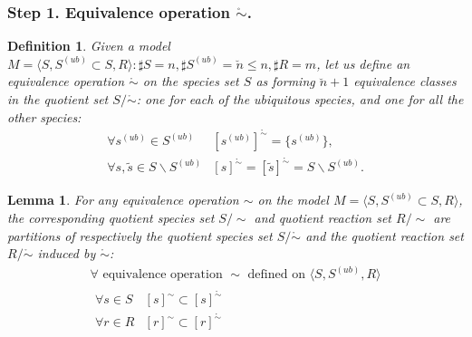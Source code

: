 \documentclass[9pt]{article}
\newcounter{lm}
\newcounter{def}
\newcounter{rm}
\begin{document}
\subsubsection*{Step 1. Equivalence operation $\mathring{\sim}$.}
\newtheorem{eq0}[def]{Definition}\label{equiv0}
\begin{eq0}
Given a model $M=\langle S, S^{(ub)}\subset{S}, R \rangle : \sharp S = n, \sharp S^{(ub)}=\breve{n} \leq n, \sharp R = m$, let us define an \emph{equivalence operation $\mathring{\sim}$} on the species set $S$ as forming $\breve{n} + 1$ equivalence classes in the quotient set $S/\mathring{\sim}$: one for each of the ubiquitous species, and one for all the other species:
\[ \begin{array}{cl}
\mbox{$\forall s^{(ub)} \in S^{(ub)}$} & \mbox{$[s^{(ub)}]^{\mathring{\sim}} = \{s^{(ub)}\}$}, \\
\mbox{$\forall s, \tilde{s} \in S\backslash S^{(ub)}$} & \mbox{$[s]^{\mathring{\sim} } = [\tilde{s}]^{\mathring{\sim} } = S \backslash S^{(ub)}$}. 
\end{array} \]

\end{eq0}
\newtheorem{l1}[lm]{Lemma}
\begin{l1}
For any equivalence operation $\sim$ on the model $M=\langle S, S^{(ub)} \subset S, R \rangle$, the corresponding quotient species set $S/\sim$ and quotient reaction set $R/\sim$ are partitions of respectively the quotient species set $S/\mathring{\sim}$ and the quotient reaction set $R/\mathring{\sim} $ induced by $\mathring{\sim}$:
\[ \begin{array}{c}
\mbox{$\forall $ equivalence operation $\sim$ defined on $\langle S, S^{(ub)}, R \rangle$} \\
\begin{array}{cl}
\mbox{$\forall s \in S$} & \mbox{$[s]^{\sim} \subset [s]^{\mathring{\sim}}$} \\
\mbox{$\forall r \in R$} & \mbox{$[r]^{\sim} \subset [r]^{\mathring{\sim}} $}
\end{array}
\end{array} \]

\end{l1}
\end{document}

